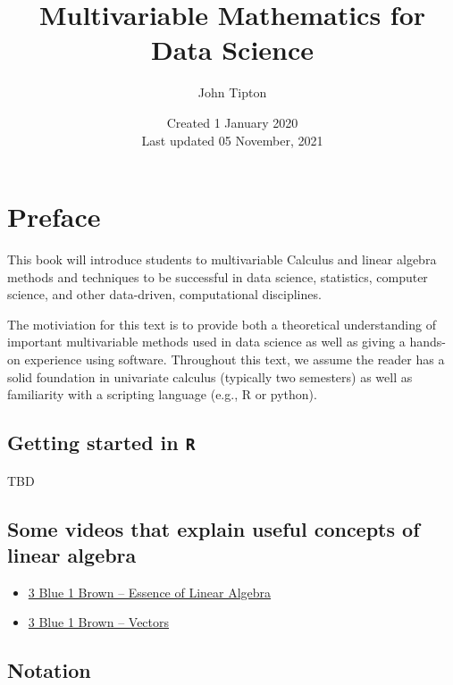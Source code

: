 \documentclass[
]{book}
\title{Multivariable Mathematics for Data Science}
\author{John Tipton}
\date{Created 1 January 2020\\
Last updated 05 November, 2021}
\theoremstyle{definition}
\theoremstyle{definition}
\theoremstyle{definition}
\theoremstyle{definition}
\theoremstyle{remark}
\begin{document}
\maketitle

{
\setcounter{tocdepth}{1}
\tableofcontents
}
\hypertarget{preface}{%
\chapter{Preface}\label{preface}}

This book will introduce students to multivariable Calculus and linear algebra methods and techniques to be successful in data science, statistics, computer science, and other data-driven, computational disciplines.

The motiviation for this text is to provide both a theoretical understanding of important multivariable methods used in data science as well as giving a hands-on experience using software. Throughout this text, we assume the reader has a solid foundation in univariate calculus (typically two semesters) as well as familiarity with a scripting language (e.g., R or python).

\hypertarget{getting-started-in-r}{%
\section{\texorpdfstring{Getting started in \texttt{R}}{Getting started in R}}\label{getting-started-in-r}}

TBD

\hypertarget{some-videos-that-explain-useful-concepts-of-linear-algebra}{%
\section{Some videos that explain useful concepts of linear algebra}\label{some-videos-that-explain-useful-concepts-of-linear-algebra}}

\begin{itemize}
\item
  \href{https://www.3blue1brown.com/lessons/eola-preview}{3 Blue 1 Brown -- Essence of Linear Algebra}
\item
  \href{https://www.3blue1brown.com/lessons/vectors}{3 Blue 1 Brown -- Vectors}
\end{itemize}

\hypertarget{notation}{%
\section{Notation}\label{notation}}
\end{document}
